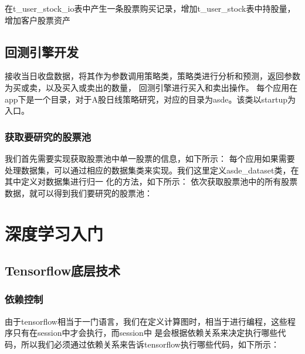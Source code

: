 \documentclass{article}
\begin{document}
在t\_user\_stock\_io表中产生一条股票购买记录，增加t\_user\_stock表中持股量，增加客户股票资产


\subsection{回测引擎开发}
接收当日收盘数据，将其作为参数调用策略类，策略类进行分析和预测，返回参数为买或卖，以及买入或卖出的数量，
回测引擎进行买入和卖出操作。
每个应用在app下是一个目录，对于A股日线策略研究，对应的目录为asde。该类以startup为入口。
\subsubsection{获取要研究的股票池}
我们首先需要实现获取股票池中单一股票的信息，如下所示：
每个应用如果需要处理数据集，可以通过相应的数据集类来实现。我们这里定义asde\_dataset类，在其中定义对数据集进行归一
化的方法，如下所示：
依次获取股票池中的所有股票数据，就可以得到我们要研究的股票池：


















\section{深度学习入门}
\subsection{Tensorflow底层技术}
\subsubsection{依赖控制}
由于tensorflow相当于一门语言，我们在定义计算图时，相当于进行编程，这些程序只有在session中才会执行，而session中
是会根据依赖关系来决定执行哪些代码，所以我们必须通过依赖关系来告诉tensorflow执行哪些代码，如下所示：
\end{document}
